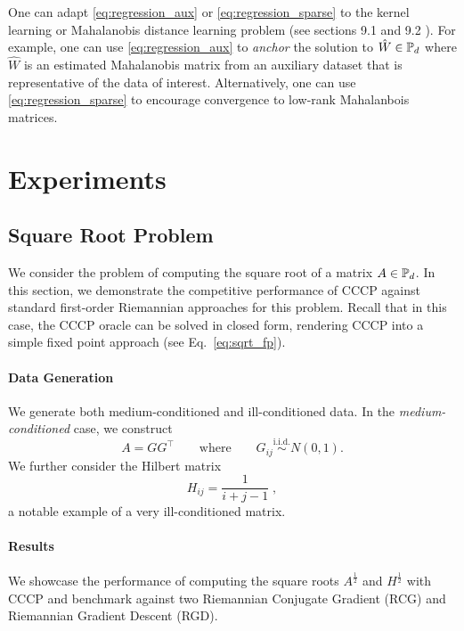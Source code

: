 \documentclass[sn-nature]{sn-jnl}%
\theoremstyle{thmstyleone}%
\theoremstyle{thmstyletwo}%
\theoremstyle{thmstylethree}%
\begin{document}
One can adapt \eqref{eq:regression_aux} or \eqref{eq:regression_sparse} to the kernel learning or Mahalanobis distance learning problem (see sections 9.1 and 9.2 \cite{regression_pd}). For example, one can use \eqref{eq:regression_aux} to \emph{anchor} the solution to $\hat{W} \in \mathbb{P}_d$ where $\hat{W}$ is an estimated Mahalanobis matrix from an auxiliary dataset that is representative of the data of interest. Alternatively, one can use \eqref{eq:regression_sparse} to encourage convergence to low-rank Mahalanbois matrices.






\section{Experiments}

\subsection{Square Root Problem}
We consider the problem of computing the square root of a matrix $A \in \mathbb{P}_d$. 
 In this section, we demonstrate the competitive performance of CCCP against standard first-order Riemannian approaches for this problem. Recall that in this case, the CCCP oracle can be solved in closed form, rendering CCCP into a simple fixed point approach (see Eq.~\ref{eq:sqrt_fp}).


\paragraph{Data Generation}
We generate both medium-conditioned and ill-conditioned data. In the \textit{medium-conditioned} case, we construct 
\[
A = G G^\top \qquad \text{where} \qquad G_{ij} \stackrel{\text{i.i.d.}}{\sim} N(0,1).
\]
We further consider the Hilbert matrix
\[
H_{ij} = \frac{1}{i+j-1} \; ,
\]
a notable example of a very ill-conditioned matrix.
 

 \paragraph{Results}
 We showcase the performance of computing the square roots $A^{\frac{1}{2}}$ and $H^{\frac{1}{2}}$ with CCCP and benchmark against two Riemannian Conjugate Gradient (RCG) and Riemannian Gradient Descent (RGD).
\end{document}
